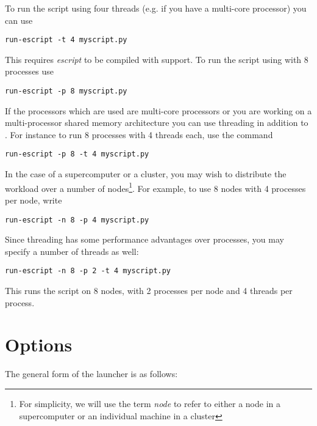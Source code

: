 To run the script using four threads (e.g. if you have a multi-core processor)
you can use
\begin{verbatim}
run-escript -t 4 myscript.py
\end{verbatim}
This requires {\it escript} to be compiled with \OPENMP\cite{OPENMP} support.
To run the script using \MPI\cite{MPI} with 8 processes use
\begin{verbatim}
run-escript -p 8 myscript.py
\end{verbatim}
If the processors which are used are multi-core processors or you are working
on a multi-processor shared memory architecture you can use threading in
addition to \MPI.
For instance to run 8 \MPI processes with 4 threads each, use the command
\begin{verbatim}
run-escript -p 8 -t 4 myscript.py
\end{verbatim}
In the case of a supercomputer or a cluster, you may wish to distribute the
workload over a number of nodes\footnote{For simplicity, we will use the term
\emph{node} to refer to either a node in a supercomputer or an individual
machine in a cluster}.
For example, to use 8 nodes with 4 \MPI processes per node, write
\begin{verbatim}
run-escript -n 8 -p 4 myscript.py
\end{verbatim}
Since threading has some performance advantages over processes, you may
specify a number of threads as well:
\begin{verbatim}
run-escript -n 8 -p 2 -t 4 myscript.py
\end{verbatim}
This runs the script on 8 nodes, with 2 processes per node and 4 threads per
process.

\section{Options}
The general form of the  launcher is as follows:



